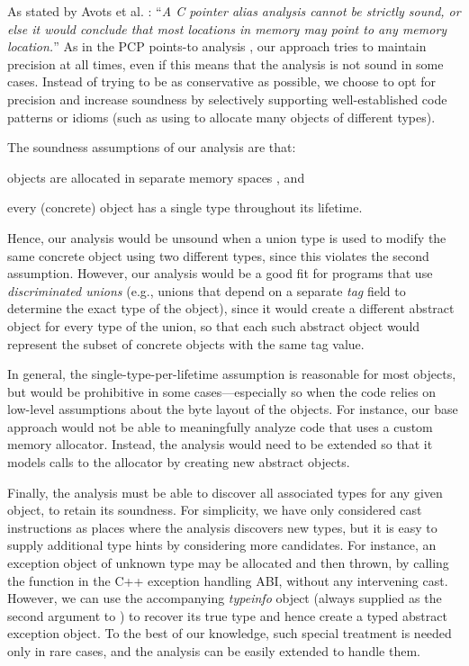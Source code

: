 As stated by Avots et al. \cite{icse/AvotsDLL05}: ``\textit{A C
  pointer alias analysis cannot be strictly sound, or else it would
  conclude that most locations in memory may point to any memory
  location.}''
%
As in the PCP points-to analysis \cite{icse/AvotsDLL05}, our approach
tries to maintain precision at all times, even if this means that the
analysis is not sound in some cases.
%
Instead of trying to be as conservative as possible, we choose to opt
for precision and increase soundness by selectively supporting
well-established code patterns or idioms (such as using
 to allocate many objects of different types).
%

The soundness assumptions of our analysis are that:
\begin{inparaenum}[(i)]
\item objects are allocated in separate memory spaces
  \cite{icse/AvotsDLL05}, and 
\item every (concrete) object has a single type throughout its
  lifetime.
\end{inparaenum}
%
Hence, our analysis would be unsound when a union type is used to
modify the same concrete object using two different types, since this
violates the second assumption. However, our analysis would be a good fit for
programs that use \emph{discriminated unions} (e.g., unions that
depend on a separate \emph{tag} field to determine the exact type of
the object), since it would create a different abstract object for
every type of the union, so that each such abstract object would
represent the subset of concrete objects with the same tag value.

In general, the single-type-per-lifetime assumption is reasonable for
most objects, but would be prohibitive in some cases---especially so
when the code relies on low-level assumptions about the byte layout of
the objects. For instance, our base approach would not be able to
meaningfully analyze code that uses a custom memory
allocator. Instead, the analysis would need to be extended so that it
models calls to the allocator by creating new abstract objects.

Finally, the analysis must be able to discover all associated types
for any given object, to retain its soundness. For simplicity, we
have only considered cast instructions as places where the
analysis discovers new types, but it is easy to supply additional type
hints by considering more candidates. For instance, an
exception object of unknown type may be allocated and then thrown, by
calling the  function in the C++ exception handling
ABI, without any intervening cast. However, we can use the
accompanying \emph{typeinfo} object (always supplied as the second
argument to ) to recover its true type and hence
create a typed abstract exception object. To the best of our
knowledge, such special treatment is needed only in rare cases, and
the analysis can be easily extended to handle them.


